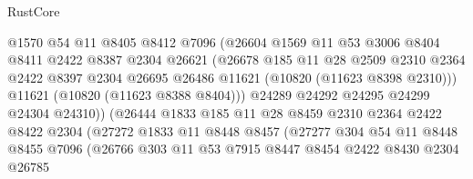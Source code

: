 \begin{lexlean}{RustCore}
\begin{coremodule}
                            @1570
                            @54
                            @11
                            @8405
                            @8412
                            @7096
                            (@26604
                              @1569
                              @11
                              @53
                              @3006
                              @8404
                              @8411
                              @2422
                              @8387
                              @2304
                              @26621
                              (@26678
                                @185
                                @11
                                @28
                                @2509
                                @2310
                                @2364
                                @2422
                                @8397
                                @2304
                                @26695
                                @26486
                                @11621
                                (@10820 (@11623 @8398 @2310)))
                              @11621
                              (@10820 (@11623 @8388 @8404)))
                            @24289
                            @24292
                            @24295
                            @24299
                            @24304
                            @24310))
                        (@26444
                          @1833
                          @185
                          @11
                          @28
                          @8459
                          @2310
                          @2364
                          @2422
                          @8422
                          @2304
                          (@27272
                            @1833
                            @11
                            @8448
                            @8457
                            (@27277
                              @304
                              @54
                              @11
                              @8448
                              @8455
                              @7096
                              (@26766
                                @303
                                @11
                                @53
                                @7915
                                @8447
                                @8454
                                @2422
                                @8430
                                @2304
                                @26785

\end{coremodule}
\end{lexlean}
